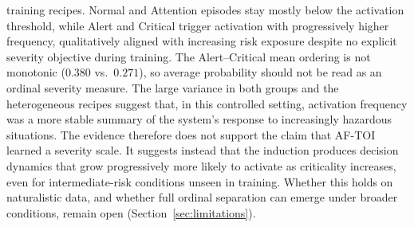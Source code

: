 \documentclass[a4paper,fleqn]{cas-dc}
\newcommand{\AFTOI}{\mbox{AF-TOI}\xspace}
\begin{document}
training recipes. Normal and Attention episodes stay mostly below the activation
threshold, while Alert and Critical trigger activation with progressively higher
frequency, qualitatively aligned with increasing risk exposure despite no
explicit severity objective during training.
The Alert--Critical mean ordering is not monotonic ($0.380$ vs.\ $0.271$), so
average probability should not be read as an ordinal severity measure. The large
variance in both groups and the heterogeneous recipes suggest that, in this
controlled setting, activation frequency was a more stable summary of the
system's response to increasingly hazardous situations.
The evidence therefore does not support the claim that \AFTOI learned a severity
scale. It suggests instead that the induction produces decision dynamics that
grow progressively more likely to activate as criticality increases, even for
intermediate-risk conditions unseen in training. Whether this holds on
naturalistic data, and whether full ordinal separation can emerge under broader
conditions, remain open (Section~\ref{sec:limitations}).
\end{document}
